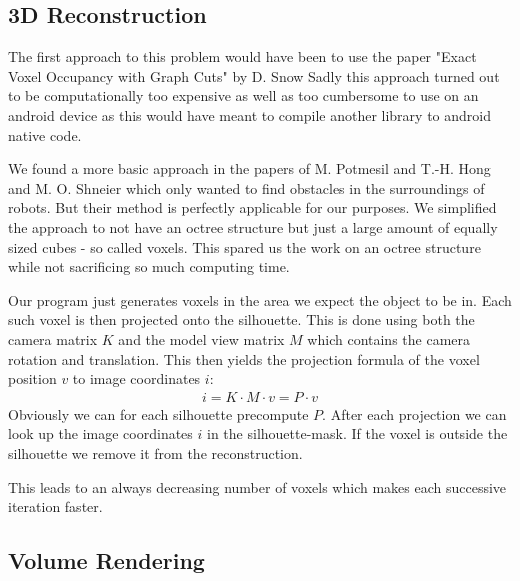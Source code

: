 \documentclass[10pt,twocolumn,letterpaper]{article}
\begin{document}
\subsection{3D Reconstruction}

The first approach to this problem would have been to use the paper "Exact Voxel Occupancy with Graph Cuts" by D. Snow \etal \cite{Snow} Sadly this approach turned out to be computationally too expensive as well as too cumbersome to use on an android device as this would have meant to compile another library to android native code.

We found a more basic approach in the papers of M. Potmesil \cite{Potmesil} and T.-H. Hong and M. O. Shneier \cite{Hong} which only wanted to find obstacles in the surroundings of robots. But their method is perfectly applicable for our purposes. We simplified the approach to not have an octree structure but just a large amount of equally sized cubes - so called voxels. This spared us the work on an octree structure while not sacrificing so much computing time.

Our program just generates voxels in the area we expect the object to be in. Each such voxel is then projected onto the silhouette. This is done using both the camera matrix $K$ and the model view matrix $M$ which contains the camera rotation and translation. This then yields the projection formula of the voxel position $v$ to image coordinates $i$:
\begin{align}
	i = K \cdot M \cdot v = P \cdot v
\end{align}
Obviously we can for each silhouette precompute $P$. After each projection we can look up the image coordinates $i$ in the silhouette-mask. If the voxel is outside the silhouette we remove it from the reconstruction.

This leads to an always decreasing number of voxels which makes each successive iteration faster.

\subsection{Volume Rendering}
\end{document}
